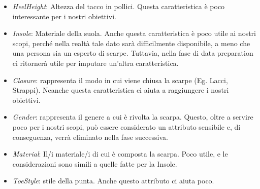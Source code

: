 \documentclass[a4paper, 11pt, oneside]{report}
\begin{document}
\begin{itemize}
\begin{center}
                    \end{center}
                    \item \textit{HeelHeight}: Altezza del tacco in pollici.
                    Questa caratteristica è poco interessante per i nostri obiettivi.
                    \item \textit{Insole}: Materiale della suola.
                    Anche questa caratteristica è poco utile ai nostri scopi, perché nella realtà tale dato sarà
                    difficilmente disponibile, a meno che una persona sia un esperto di scarpe.
                    Tuttavia, nella fase di data preparation ci ritornerà utile per imputare un'altra caratteristica.
                    \item \textit{Closure}: rappresenta il modo in cui viene chiusa la scarpe (Eg. Lacci, Strappi).
                    Neanche questa caratteristica ci aiuta a raggiungere i nostri obiettivi.
                    \item \textit{Gender}: rappresenta il genere a cui è rivolta la scarpa.
                    Questo, oltre a servire poco per i nostri scopi, può essere considerato un attributo sensibile e,
                    di conseguenza, verrà eliminato nella fase successiva.
                    \item \textit{Material}: Il/i materiale/i di cui è composta la scarpa.
                    Poco utile, e le considerazioni sono simili a quelle fatte per la Insole.
                    \item \textit{ToeStyle}: stile della punta.
                    Anche questo attributo ci aiuta poco.
                \end{itemize}
                \newpage
\end{document}
